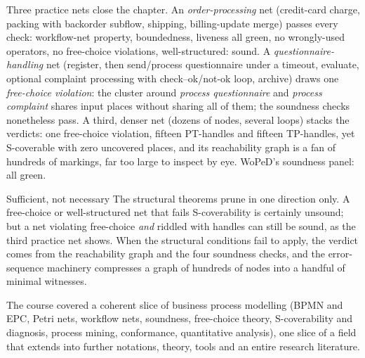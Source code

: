 Three practice nets close the chapter. An \emph{order-processing} net (credit-card charge, packing with backorder subflow, shipping, billing-update merge) passes every check: workflow-net property, boundedness, liveness all green, no wrongly-used operators, no free-choice violations, well-structured: sound. A \emph{questionnaire-handling} net (register, then send/process questionnaire under a timeout, evaluate, optional complaint processing with check--ok/not-ok loop, archive) draws one \emph{free-choice violation}: the cluster around \emph{process questionnaire} and \emph{process complaint} shares input places without sharing all of them; the soundness checks nonetheless pass. A third, denser net (dozens of nodes, several loops) stacks the verdicts: one free-choice violation, fifteen PT-handles and fifteen TP-handles, yet S-coverable with zero uncovered places, and its reachability graph is a fan of hundreds of markings, far too large to inspect by eye. WoPeD's soundness panel: all green.
\begin{notebox}{Sufficient, not necessary}
The structural theorems prune in one direction only. A free-choice or well-structured net that fails S-coverability is certainly unsound; but a net violating free-choice \emph{and} riddled with handles can still be sound, as the third practice net shows. When the structural conditions fail to apply, the verdict comes from the reachability graph and the four soundness checks, and the error-sequence machinery compresses a graph of hundreds of nodes into a handful of minimal witnesses.
\end{notebox}

The course covered a coherent slice of business process modelling (BPMN and EPC, Petri nets, workflow nets, soundness, free-choice theory, S-coverability and diagnosis, process mining, conformance, quantitative analysis), one slice of a field that extends into further notations, theory, tools and an entire research literature.
